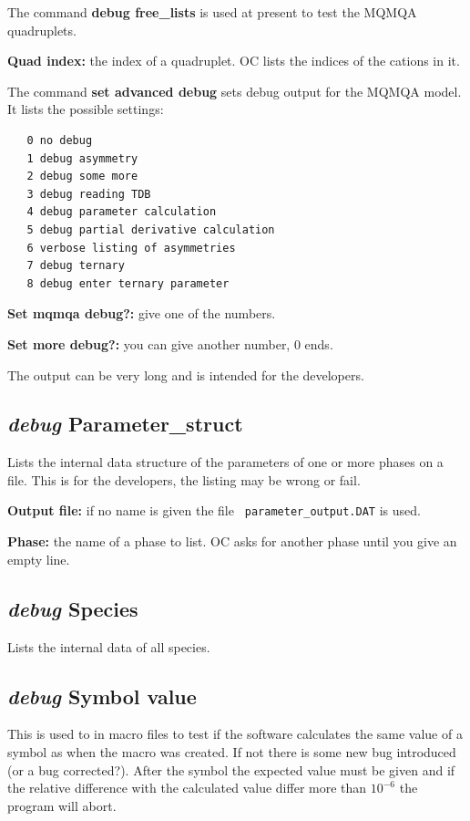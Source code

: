 \documentclass[11pt]{article}
\begin{document}
The command {\bf debug free\_lists} is used at present to test the
MQMQA quadruplets.

{\bf Quad index:} the index of a quadruplet.  OC lists the indices
of the cations in it.

The command {\bf set advanced debug} sets debug output for the MQMQA
model.  It lists the possible settings:
\begin{verbatim}
   0 no debug
   1 debug asymmetry
   2 debug some more
   3 debug reading TDB
   4 debug parameter calculation
   5 debug partial derivative calculation
   6 verbose listing of asymmetries
   7 debug ternary
   8 debug enter ternary parameter
\end{verbatim}
{\bf Set mqmqa debug?:} give one of the numbers.

{\bf Set more debug?:} you can give another number, 0 ends.

The output can be very long and is intended for the developers.

\hypertarget{Debug parameter}{}
\subsection{{\em debug} Parameter\_struct}

Lists the internal data structure of the parameters of one or more
phases on a file.  This is for the developers, the listing may be
wrong or fail.

{\bf Output file:} if no name is given the file {\tt
  parameter\_output.DAT} is used.

\hypertarget{Set Advanced}{}
{\bf Phase:} the name of a phase to list.  OC asks for another phase
until you give an empty line.

\hypertarget{Debug species}{}
\subsection{{\em debug} Species}

Lists the internal data of all species.

\hypertarget{Debug symbol value}{}
\subsection{{\em debug} Symbol value}

This is used to in macro files to test if the software calculates the
same value of a symbol as when the macro was created.  If not there is
some new bug introduced (or a bug corrected?).  After the symbol the
expected value must be given and if the relative difference with the
calculated value differ more than $10^{-6}$ the program will abort.
\end{document}
